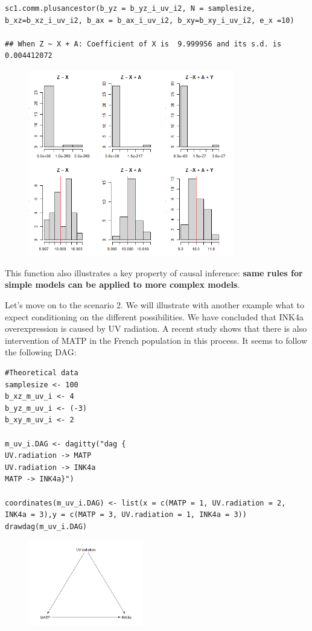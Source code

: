 \documentclass{article}
\begin{document}
\begin{lstlisting}
sc1.comm.plusancestor(b_yz = b_yz_i_uv_i2, N = samplesize, b_xz=b_xz_i_uv_i2, b_ax = b_ax_i_uv_i2, b_xy=b_xy_i_uv_i2, e_x =10)

## When Z ~ X + A: Coefficient of X is  9.999956 and its s.d. is 0.004412072
\end{lstlisting}
\begin{figure}[h]
\includegraphics[width=9cm]{sdXdecreased.png}
\centering
\end{figure} 
\newpage

This function also illustrates a key property of causal inference: \textbf{same rules for simple models can be applied to more complex models}.

Let's move on to the scenario 2. We will illustrate with another example what to expect conditioning on the different possibilities. We have concluded that INK4a overexpression is caused by UV radiation. A recent study shows that there is also intervention of MATP in the French population in this process. It seems to follow the following DAG:
\begin{lstlisting}
#Theoretical data
samplesize <- 100
b_xz_m_uv_i <- 4
b_yz_m_uv_i <- (-3)
b_xy_m_uv_i <- 2

m_uv_i.DAG <- dagitty("dag {
UV.radiation -> MATP
UV.radiation -> INK4a
MATP -> INK4a}")

coordinates(m_uv_i.DAG) <- list(x = c(MATP = 1, UV.radiation = 2, INK4a = 3),y = c(MATP = 3, UV.radiation = 1, INK4a = 3))
drawdag(m_uv_i.DAG)
\end{lstlisting}
\begin{figure}[h]
\includegraphics[width=5cm]{m.uv.i.DAG.png}
\centering
\end{figure}
\end{document}
